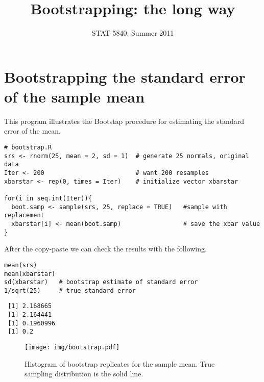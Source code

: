 \documentclass[11pt,english]{article}
\title{Bootstrapping: the long way}
\date{STAT 5840: Summer 2011}
\begin{document}
\maketitle

\thispagestyle{empty}

\section*{Bootstrapping the standard error of the sample mean}
\label{sec-1}

This program illustrates the Bootstap procedure for estimating the standard error of the mean.


\begin{verbatim}
# bootstrap.R
srs <- rnorm(25, mean = 2, sd = 1)  # generate 25 normals, original data 
Iter <- 200                         # want 200 resamples
xbarstar <- rep(0, times = Iter)    # initialize vector xbarstar

for(i in seq.int(Iter)){
  boot.samp <- sample(srs, 25, replace = TRUE)   #sample with replacement
  xbarstar[i] <- mean(boot.samp)                 # save the xbar value
}
\end{verbatim}

After the copy-paste we can check the results with the following.
\begin{verbatim}
mean(srs)
mean(xbarstar)
sd(xbarstar)   # bootstrap estimate of standard error
1/sqrt(25)     # true standard error
\end{verbatim}

\begin{verbatim}
 [1] 2.168665
 [1] 2.164441
 [1] 0.1960996
 [1] 0.2
\end{verbatim}



\begin{figure}[h!]
\centering
\texttt{[image: img/bootstrap.pdf]}
\caption{\label{fig:yplot}Histogram of bootstrap replicates for the sample mean.  True sampling distribution is the solid line.}
\end{figure}
\end{document}
